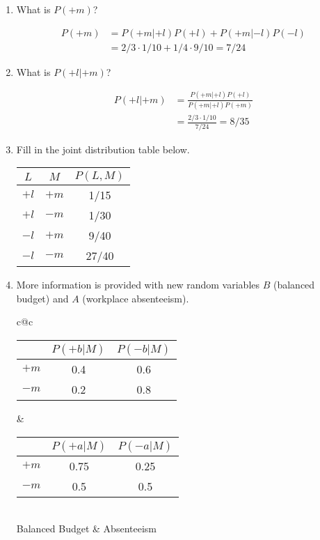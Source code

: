 \documentclass[12pt]{article}
\begin{document}
\begin{enumerate}

\item What is $P(+m)$?

\begin{align*}
P(+m) &= P(+m|+l)P(+l) + P(+m|-l)P(-l)\\
      &= 2/3 \cdot 1/10 + 1/4 \cdot 9/10 = 7/24
\end{align*}
\item What is $P(+l | +m)$?

\begin{align*}
P(+l|+m) &= \frac{P(+m|+l)P(+l)}{P(+m|+l)P(+m)}\\
         &= \frac{2/3 \cdot 1/10}{7/24} = 8/35
\end{align*}

\item Fill in the joint distribution table below.

\begin{center}
\begin{tabular}{|c|c||c|} \hline
$L$  & $M$   & $P(L, M)$ \\ \hline \hline
$+l$ & $+m$  & 1/15   \\ \hline
$+l$ & $-m$  & 1/30 \\ \hline
$-l$ & $+m$  & 9/40  \\ \hline
$-l$ & $-m$  & 27/40 \\ \hline
\end{tabular}
\end{center}

\item More information is provided with new random variables $B$
  (balanced budget) and $A$ (workplace absenteeism).

\begin{center}
\begin{tabular}{c@{\hspace*{0.5in}}c}
\begin{tabular}{|c|c|c|} \hline
     & $P(+b | M)$ & $P(-b | M)$ \\ \hline
$+m$ & 0.4         & 0.6         \\ \hline
$-m$ & 0.2         & 0.8         \\ \hline
\end{tabular} &
\begin{tabular}{|c|c|c|} \hline
     & $P(+a | M)$ & $P(-a | M)$ \\ \hline
$+m$ & 0.75        & 0.25        \\ \hline
$-m$ & 0.5         & 0.5         \\ \hline
\end{tabular} \\
Balanced Budget & Absenteeism
\end{tabular}
\end{center}


\end{enumerate}
\end{document}

